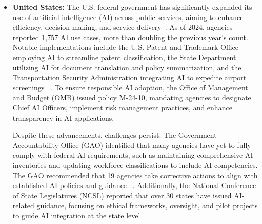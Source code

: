 \documentclass[12pt]{report}
\begin{document}
\begin{itemize}
    \item \textbf{United States:} The U.S. federal government has significantly expanded its use of artificial intelligence (AI) across public services, aiming to enhance efficiency, decision-making, and service delivery~\cite{ncsl2024ai}. As of 2024, agencies reported 1,757 AI use cases, more than doubling the previous year's count. Notable implementations include the U.S. Patent and Trademark Office employing AI to streamline patent classification, the State Department utilizing AI for document translation and policy summarization, and the Transportation Security Administration integrating AI to expedite airport screenings~\cite{brookings2024ai} . To ensure responsible AI adoption, the Office of Management and Budget (OMB) issued policy M-24-10, mandating agencies to designate Chief AI Officers, implement risk management practices, and enhance transparency in AI applications\cite{OMB-M-24-10}.
    
    Despite these advancements, challenges persist. The Government Accountability Office (GAO) identified that many agencies have yet to fully comply with federal AI requirements, such as maintaining comprehensive AI inventories and updating workforce classifications to include AI competencies. The GAO recommended that 19 agencies take corrective actions to align with established AI policies and guidance~\cite{gao2024ai} . Additionally, the National Conference of State Legislatures (NCSL) reported that over 30 states have issued AI-related guidance, focusing on ethical frameworks, oversight, and pilot projects to guide AI integration at the state level~\cite{ncsl2024ai}


\end{itemize}
\end{document}
